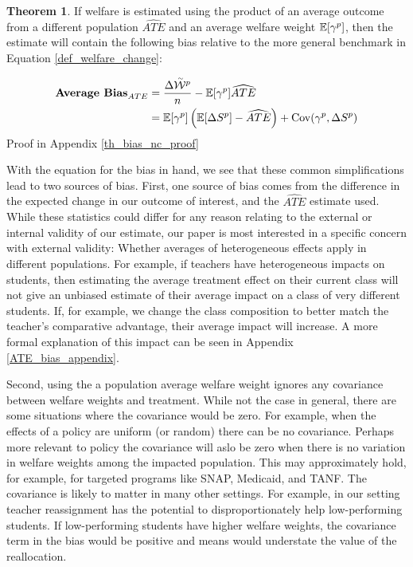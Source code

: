 \documentclass[12pt]{article}
\theoremstyle{definition}
\theoremstyle{definition}
\theoremstyle{definition}
\theoremstyle{definition}
\newtheorem{thm}{Theorem}
\begin{document}
\begin{thm}
\label{thm_bias_nc}
If welfare is estimated using the product of an average outcome from a different population $\widehat{ATE}$ and an average welfare weight $\mathbb{E}[\gamma^p]$, then the estimate will contain the following bias relative to the more general benchmark in Equation \ref{def_welfare_change}: 

\begin{align*}
    \textbf{Average Bias}_{ATE} &= \frac{\Delta \accentset{\sim}{\mathcal{W}}^p}{n} - \mathbb{E}[\gamma^p] \widehat{ATE} \\
   & = \mathbb{E}[\gamma^p] \left (\mathbb{E}[\Delta S^p]-\widehat{ATE} \right ) + \mathrm{Cov}(\gamma^p, \Delta S^p)
\end{align*}
    Proof in Appendix \ref{th_bias_nc_proof}
\end{thm}

With the equation for the bias in hand, we see that these common simplifications lead to two sources of bias. First, one source of bias comes from the difference in the expected change in our outcome of interest, and the $\widehat{ATE}$ estimate used. While these statistics could differ for any reason relating to the external or internal validity of our estimate, our paper is most interested in a specific concern with external validity: Whether averages of heterogeneous effects apply in different populations. For example, if teachers have heterogeneous impacts on students, then estimating the average treatment effect on their current class will not give an unbiased estimate of their average impact on a class of very different students. If, for example, we change the class composition to better match the teacher's comparative advantage, their average impact will increase. A more formal explanation of this impact can be seen in Appendix \ref{ATE_bias_appendix}. 

Second, using the a population average welfare weight ignores any covariance between welfare weights and treatment. While not the case in general, there are some situations where the covariance would be zero. For example, when the effects of a policy are uniform (or random) there can be no covariance. Perhaps more relevant to policy the covariance will aslo be zero when there is no variation in welfare weights among the impacted population. This may approximately hold, for example, for targeted programs like SNAP, Medicaid, and TANF. The covariance is likely to matter in many other settings. For example, in our setting teacher reassignment has the potential to disproportionately help low-performing students. If low-performing students have higher welfare weights, the covariance term in the bias would be positive and means would understate the value of the reallocation. 
\end{document}
